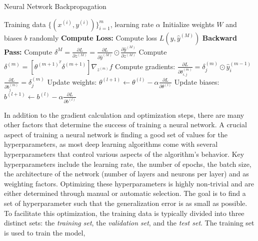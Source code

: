 \begin{algorithm}
    \caption{Neural Network Backpropagation \cite{rumelhart1986learning}}
    \label{alg:backprop}
    \begin{algorithmic}[1]
    \Require Training data $\{(x^{(i)}, y^{(i)})\}_{i=1}^{m}$, learning rate $\alpha$
    \State Initialize weights $W$ and biases $b$ randomly
    \Repeat
            \State \textbf{Compute Loss:}
            \State Compute loss $L(y, \hat{y}^{(M)})$
            \State \textbf{Backward Pass:}
            \State Compute $\delta^{M} = \frac{\partial L}{\partial z^{(M)}} = \frac{\partial L}{\partial \hat{y}^{(M)}} \odot \frac{\partial \hat{y}^{(M)}}{\partial z^{(M)}}$
                \State Compute $\delta^{(m)} = [\theta^{(m+1)^T}\delta^{(m+1)}] \nabla_{z^{(m)}} f$
                \State Compute gradients:
                \State $\frac{\partial L}{\partial \theta_{i,j}^{(m)}} = \delta^{(m)}_j \odot \hat{y}_i^{(m-1)}$
                \State $\frac{\partial L}{\partial b_j^{(m)}} = \delta_j^{(m)}$
            \EndFor
        \EndFor
            \State Update weights: $\theta^{(l+1)} \leftarrow \theta^{(l)} - \alpha \frac{\partial L}{\partial \theta^{(l)}}$
            \State Update biases: $b^{(l+1)} \leftarrow b^{(l)} - \alpha \frac{\partial L}{\partial b^{(l)}}$
        \EndFor
    \end{algorithmic}
    \end{algorithm}
In addition to the gradient calculation and optimization steps, there are many other factors that determine the success of training a neural network.
A crucial aspect of training a neural network is finding a good set of values for the hyperparameters,
as most deep learning algorithms come with several hyperparameters that control various aspects of the algorithm's behavior.
Key hyperparameters include the learning rate,
the number of epochs, the batch size, the architecture of the network (number of layers and neurons per layer) and as weighting factors.
Optimizing these hyperparameters is highly non-trivial and are either determined through manual or automatic selection.
The goal is to find a set of hyperparameter such that the generalization error is as small as possible.
To facilitate this optimization, the training data is typically divided into three distinct sets: the \emph{training set},
the \emph{validation set}, and the \emph{test set}. The training set is used to train the model,
